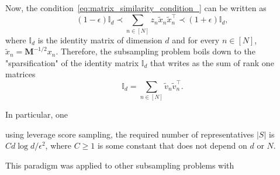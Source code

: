\documentclass[twoside,11pt]{book}
\numberwithin{theorem}{chapter}
\numberwithin{definition}{chapter}
\numberwithin{proposition}{chapter}
\numberwithin{corollary}{chapter}
\numberwithin{example}{chapter}
\numberwithin{lemma}{chapter}
\numberwithin{assumption}{chapter}
\DeclareMathOperator{\Tran}{\intercal}
\begin{document}
Now, the condition~\eqref{eq:matrix_similarity_condition_} can be written as
\begin{equation}
(1-\epsilon) \mathbb{I}_{d} \prec \sum\limits_{n \in [N]} z_{n} \tilde{x}_{n} \tilde{x}_{n}^{\Tran} \prec (1+\epsilon) \mathbb{I}_{d},
\end{equation}
where $\mathbb{I}_{d}$ is the identity matrix of dimension $d$ and for every $n \in [N]$, $\tilde{x}_{n} = \bm{M}^{-1/2} x_{n}$.
Therefore, the subsampling problem boils down to the "sparsification" of the identity matrix $\mathbb{I}_{d}$ that writes as the sum of rank one matrices
\begin{equation}\label{eq:sum_to_identity}
\mathbb{I}_{d} = \sum\limits_{n \in [N]}\tilde{v}_{n}\tilde{v}_{n}^{\Tran}.
\end{equation}


In particular, one 

 using leverage score sampling, the required number of representatives $|S|$ is $ C d \log d/\epsilon^{2}$, where $C\geq 1$ is some constant that does not depend on $d$ or $N$.


This paradigm was applied to other subsampling problems with 


\end{document}
